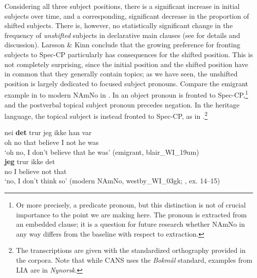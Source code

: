 \documentclass[output=paper]{langscibook}
\begin{document}
Considering all three subject positions, there is a significant increase in initial subjects over time, and a corresponding, significant decrease in the proportion of shifted subjects. There is, however, no statistically significant change in the frequency of \textit{unshifted} subjects in declarative main clauses (see \citealt{LarssonForthcoming} for details and discussion). Larsson \& Kinn conclude that the growing preference for fronting subjects to Spec-CP particularly has consequences for the shifted position. This is not completely surprising, since the initial position and the shifted position have in common that they generally contain topics; as we have seen, the unshifted position is largely dedicated to focused subject pronouns. Compare the emigrant example in  to modern NAmNo in . In  an object pronoun is fronted to Spec-CP,\footnote{Or more precisely, a predicate pronoun, but this distinction is not of crucial importance to the point we are making here. The pronoun is extracted from an embedded clause; it is a question for future research whether NAmNo in any way differs from the baseline with respect to extraction.} and the postverbal topical subject pronoun precedes negation. In the heritage language, the topical subject is instead fronted to Spec-CP, as in .\footnote{The transcriptions are given with the standardized orthography provided in the corpora. Note that while CANS uses the \textit{Bokmål} standard, examples from LIA are in \textit{Nynorsk}.}

\ea\label{ex:larsson:10}
\ea 
{}   {nei} \textbf{{det}} {trur}   {jeg}   {ikke}   {han}   {var}\\
     oh   no that believe I   not   he   was\\
\glt ‘oh no, I don’t believe that he was’ (emigrant,      blair\_WI\_19um)\label{ex:larsson:10a}\\
\ex 
{}   \textbf{jeg}  {trur}   {ikke}   {det}\\
      no I   believe not   that\\
\glt ‘no, I don’t think so’ (modern NAmNo, westby\_WI\_03gk; \citealt{LarssonForthcoming}, ex. 14–15)\label{ex:larsson:10b}\\
\z
\z
\end{document}
